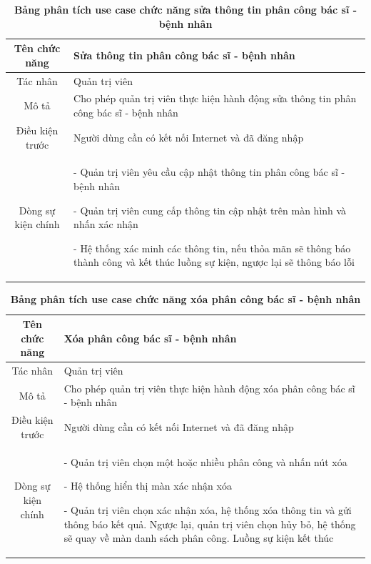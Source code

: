   \begin{table}[H]
    \caption{\bfseries \fontsize{12pt}{0pt}\selectfont Bảng phân tích use case chức năng sửa thông tin phân công bác sĩ - bệnh nhân}
    \centering
    \begin{tabularx}{0.9\textwidth}{|c|X|}
      \hline
      \textbf{Tên chức năng} & \textbf{Sửa thông tin phân công bác sĩ - bệnh nhân} \\
      \hline
      Tác nhân & Quản trị viên \\
      \hline
      Mô tả & Cho phép quản trị viên thực hiện hành động sửa thông tin phân công bác sĩ - bệnh nhân \\
      \hline
      Điều kiện trước & Người dùng cần có kết nối Internet và đã đăng nhập \\
      \hline
      Dòng sự kiện chính & 
        - Quản trị viên yêu cầu cập nhật thông tin phân công bác sĩ - bệnh nhân

        - Quản trị viên cung cấp thông tin cập nhật trên màn hình và nhấn xác nhận

        - Hệ thống xác minh các thông tin, nếu thỏa mãn sẽ thông báo thành công và kết thúc luồng sự kiện, ngược lại 
        sẽ thông báo lỗi         
        \\
      \hline
    \end{tabularx}
  \end{table}

  \begin{table}[H]
    \caption{\bfseries \fontsize{12pt}{0pt}\selectfont Bảng phân tích use case chức năng xóa phân công bác sĩ - bệnh nhân}
    \centering
    \begin{tabularx}{0.9\textwidth}{|c|X|}
      \hline
      \textbf{Tên chức năng} & \textbf{Xóa phân công bác sĩ - bệnh nhân} \\
      \hline
      Tác nhân & Quản trị viên \\
      \hline
      Mô tả & Cho phép quản trị viên thực hiện hành động xóa phân công bác sĩ - bệnh nhân \\
      \hline
      Điều kiện trước & Người dùng cần có kết nối Internet và đã đăng nhập \\
      \hline
      Dòng sự kiện chính & 
        - Quản trị viên chọn một hoặc nhiều phân công và nhấn nút xóa

        - Hệ thống hiển thị màn xác nhận xóa

        - Quản trị viên chọn xác nhận xóa, hệ thống xóa thông tin và gửi thông báo kết quả. Ngược lại, quản trị viên 
        chọn hủy bỏ, hệ thống sẽ quay về màn danh sách phân công. Luồng sự kiện kết thúc
        \\
      \hline
    \end{tabularx}
  \end{table}

